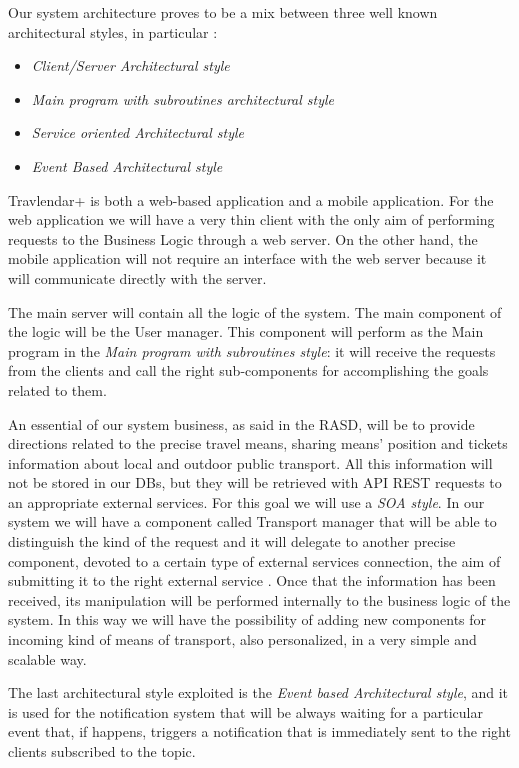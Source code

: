 \newpage
{}
Our system architecture proves to be a mix between three well known architectural styles, in particular : 

\begin{itemize}
\setlength{\leftskip}{0.5cm}
\item \emph{Client/Server Architectural style}
\item \emph{Main program with subroutines architectural style}
\item \emph{Service oriented Architectural style}
\item \emph{Event Based Architectural style}
\end{itemize}

Travlendar+ is both a web-based application and a mobile application. For the web application we will have a very thin client with the only aim of performing requests to the Business Logic through a web server.
On the other hand, the mobile application will not require an interface with the web server because it will communicate directly with the server.
\\\par
The main server will contain all the logic of the system. The main component of the logic will be the User manager. This component will perform as the Main program in the \emph{Main program with subroutines style}: it will receive the requests from the clients and call the right sub-components for accomplishing the goals related to them.
\\\par
An essential of our system business, as said in the RASD, will be to provide directions related to the precise travel means, sharing means’ position and tickets information about local and outdoor public transport. All this information will not be stored in our DBs, but they will be retrieved with API REST requests to an appropriate external services. For this goal we will use a \emph{SOA style}. 
In our system we will have a component called Transport manager that will be able to distinguish the kind of the request and it will delegate to another precise component, devoted to a certain type of external services connection, the aim of submitting it to the right external service . Once that the information has been received, its manipulation will be performed internally to the business logic of the system. In this way we will have the possibility of adding new components for incoming kind of means of transport, also personalized, in a very simple and scalable way.
\\\par
The last architectural style exploited is the \emph{Event based Architectural style}, and it is used for the notification system that will be always waiting for a particular event that, if happens, triggers a notification that is immediately sent to the right clients subscribed to the topic. 

